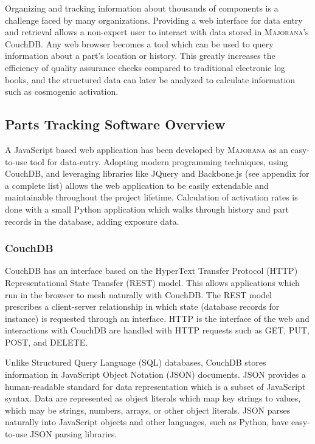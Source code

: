 \documentclass[journal]{IEEEtran}
\begin{document}
Organizing and tracking information about thousands of components is a
challenge faced by many organizations. Providing a web interface for data entry and retrieval allows
a non-expert user to interact with data stored in \textsc{Majorana}'s CouchDB. Any web browser becomes a tool which can
be used to query information about a part's location or history. This greatly increases the efficiency of quality assurance
checks compared to traditional electronic log books, and the structured data can later be analyzed to calculate information
such as cosmogenic activation.

\subsection{Parts Tracking Software Overview}
A JavaScript based web application has been developed by \textsc{Majorana} as an easy-to-use tool for data-entry.
Adopting modern programming techniques, using CouchDB, and leveraging libraries like JQuery and Backbone.js (see appendix for a complete list) allows the
web application to be easily extendable and maintainable throughout the project lifetime. Calculation of
activation rates is done with a small Python application which walks through history and part records in the database,
adding exposure data.

\subsubsection{CouchDB}
CouchDB has an interface based on the HyperText Transfer Protocol (HTTP) Representational State Transfer (REST) model.
This allows applications which run in the browser to mesh naturally with CouchDB.
The REST model prescribes a client-server
relationship in which state (database records for instance) is requested through an interface.
HTTP is the interface of the web and interactions with CouchDB are handled with HTTP
requests such as GET, PUT, POST, and DELETE. 

Unlike Structured Query Language (SQL) databases, CouchDB stores information in JavaScript Object Notation (JSON) \cite{json}
documents.
JSON provides a human-readable
standard for data representation which is a subset of JavaScript syntax. Data are represented as object
literals which map key strings to values, which may be strings, numbers, arrays, or other object literals. 
JSON parses naturally into JavaScript objects and other languages, such as Python, have easy-to-use
JSON parsing libraries. 
\end{document}
